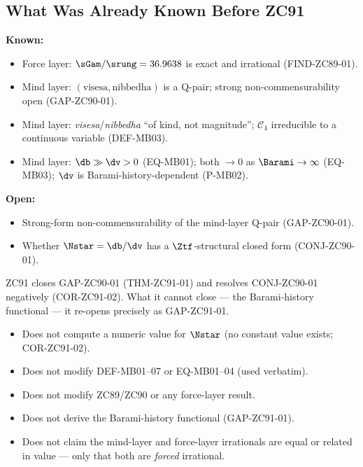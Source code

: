 \documentclass[12pt, a4paper]{article}
\begin{document}
\subsection{What Was Already Known Before ZC91}

\begin{keybox}[title={Pre-ZC91 Status}]
\textbf{Known:}
\begin{itemize}[leftmargin=2em, noitemsep]
  \item Force layer: $\sGam/\srung=36.9638$ is exact and irrational
    (FIND-ZC89-01).
  \item Mind layer: $(\text{visesa},\text{nibbedha})$ is a Q-pair; strong
    non-commensurability open (GAP-ZC90-01).
  \item Mind layer: \emph{visesa}/\emph{nibbedha} ``of kind, not
    magnitude''; $\mathcal{C}_4$ irreducible to a continuous variable
    (DEF-MB03).
  \item Mind layer: $\db\gg\dv>0$ (EQ-MB01); both $\to0$ as
    $\Barami\to\infty$ (EQ-MB03); $\dv$ is Barami-history-dependent
    (P-MB02).
\end{itemize}

\textbf{Open:}
\begin{itemize}[leftmargin=2em, noitemsep]
  \item Strong-form non-commensurability of the mind-layer Q-pair
    (GAP-ZC90-01).
  \item Whether $\Nstar=\db/\dv$ has a $\Ztf$-structural closed form
    (CONJ-ZC90-01).
\end{itemize}

ZC91 closes GAP-ZC90-01 (THM-ZC91-01) and resolves CONJ-ZC90-01
negatively (COR-ZC91-02). What it cannot close --- the Barami-history
functional --- it re-opens precisely as GAP-ZC91-01.
\end{keybox}

\begin{keybox}[title={What ZC91 Does NOT Do}]
\begin{itemize}[leftmargin=2em, noitemsep]
  \item Does not compute a numeric value for $\Nstar$ (no constant value
    exists; COR-ZC91-02).
  \item Does not modify DEF-MB01--07 or EQ-MB01--04 (used verbatim).
  \item Does not modify ZC89/ZC90 or any force-layer result.
  \item Does not derive the Barami-history functional (GAP-ZC91-01).
  \item Does not claim the mind-layer and force-layer irrationals are
    equal or related in value --- only that both are \emph{forced}
    irrational.
\end{itemize}
\end{keybox}
\end{document}

